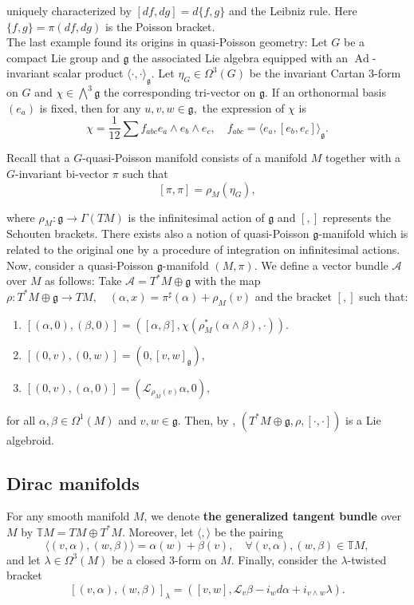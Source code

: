 \documentclass[reqno]{amsart}
\theoremstyle{plain}
\theoremstyle{definition}
\newcommand{\g}{\mathfrak{g}}
\newcommand{\too}{\longrightarrow}
\newcommand{\Ad}{\operatorname{Ad}}
\renewcommand{\L}{\mathcal{L}}
\newcommand{\A}{\mathcal{A}}
\newcommand{\tM}{\mathbb{T}M}
\begin{document}
uniquely characterized by $[df,dg] = d\{f,g\}$ and the Leibniz rule. Here $\{f,g\} = \pi(df,dg)$ is the Poisson bracket.\\ The last example found its origins in quasi-Poisson geometry: Let $G$ be a compact Lie group and $\g$ the associated Lie algebra equipped with an $\Ad$-invariant scalar product $\langle \cdot , \cdot \rangle_{\g}.$ Let $\eta_G \in \Omega^{3}(G)$ be the invariant Cartan 3-form on $G$ and $\chi \in \bigwedge^{3} \g$ the corresponding tri-vector on $\g.$ If an orthonormal basis $(e_a)$ is fixed, then for any $u,v,w \in \g,$ the expression of $\chi$ is \begin{equation}
    \chi = \dfrac{1}{12}\sum f_{abc} e_{a}\wedge e_{b}\wedge e_{c}, \quad f_{abc} = \langle e_{a}, [e_b,e_c]\rangle_{\g}.
\end{equation}

Recall that a $G$-quasi-Poisson manifold consists of a manifold $M$ together with a $G$-invariant bi-vector $\pi$ such that \[ [\pi,\pi] = \rho_{M}(\eta_G),
\]

where $\rho_{M}: \g \too \Gamma(TM)$ is the infinitesimal action of $\g$ and $[,]$ represents the Schouten brackets. There exists also a notion of  quasi-Poisson $\g$-manifold which is related to the original one by a procedure of integration on infinitesimal actions. Now, consider a quasi-Poisson $\g$-manifold $(M,\pi)$. We define a vector bundle $\A$ over $M$ as follows: Take $\A = T^{*}M \oplus \g$ with the map $\rho: T^{*}M \oplus \g \too TM, \quad (\alpha,x) = \pi^{\sharp}(\alpha) + \rho_{M}(v)$ and the bracket $[,]$ such that: \begin{enumerate}
    \item $[(\alpha,0),(\beta,0)] = ([\alpha,\beta], \chi(\rho^{*}_{M}(\alpha \wedge \beta),\cdot)).$
    \item $[(0,v),(0,w)] = (0,[v,w]_{\g}),$
    \item $[(0,v),(\alpha,0)] = (\L_{\rho_{M}(v)}\alpha, 0),$
\end{enumerate}
for all $\alpha,\beta \in \Omega^{1}(M)$ and $v,w \in \g.$ Then, by \cite[]{bursztyn2005dirac}, $(T^{*}M \oplus \g,\rho,[\cdot,\cdot])$ is a Lie algebroid.

\subsection{Dirac manifolds} For any smooth manifold $M$, we denote \textbf{the generalized tangent bundle} over $M$ by $\mathbb{T}M = TM \oplus T^{*}M$. Moreover, let $\langle,\rangle$ be the pairing \[
\langle(v,\alpha),(w,\beta)\rangle = \alpha(w) + \beta(v), \quad \forall (v,\alpha),(w,\beta) \in \tM,
 \] and let $\lambda \in \Omega^{3}(M)$ be a closed 3-form on $M.$ Finally, consider the $\lambda$-twisted bracket \[
 [(v,\alpha),(w,\beta)]_{\lambda} = ([v,w], \L_{v}\beta - i_{w}d\alpha + i_{v\wedge w}\lambda).  
 \]
\end{document}
